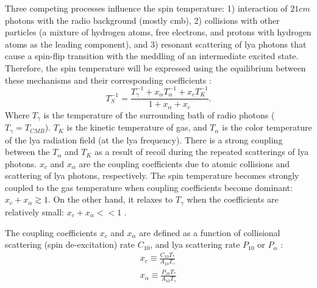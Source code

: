 \documentclass[12pt, TexShade, letterpaper]{report}
\begin{document}
Three competing processes influence the spin temperature: 1) interaction of $21cm$ photons with the radio background (mostly \gls{cmb}), 2) collisions with other particles (a mixture of hydrogen atoms, free electrons, and protons with hydrogen atoms as the leading component), and 3) resonant scattering of \gls{lya} photons that cause a spin-flip transition with the meddling of an intermediate excited state. Therefore, the spin temperature will be expressed using the equilibrium between these mechanisms and their corresponding coefficients \cite{low_frequency,21century}:
\begin{equation}
    T^{-1}_S = \frac{T^{-1}_\gamma + x_\alpha T^{-1}_\alpha + x_c T^{-1}_K}{1 + x_\alpha + x_c}.
\end{equation}
Where $T_\gamma$ is the temperature of the surrounding bath of radio photons ($T_\gamma = T_{CMB}$). $T_K$ is the kinetic temperature of gas, and $T_\alpha$ is the color temperature of the \gls{lya} radiation field (at the \gls{lya} frequency). There is a strong coupling between the $T_\alpha$ and $T_K$ as a result of recoil during the repeated scatterings of \gls{lya} photons. $x_c$ and $x_\alpha$ are the coupling coefficients due to atomic collisions and scattering of \gls{lya} photons, respectively. The spin temperature becomes strongly coupled to the gas temperature when coupling coefficients become dominant: $x_c + x_\alpha \gtrsim 1$. On the other hand, it relaxes to $T_\gamma$ when the coefficients are relatively small: $x_c + x_\alpha << 1$ \cite{21century, low_frequency}. \par
The coupling coefficients $x_c$ and $x_\alpha$ are defined as a function of collisional scattering (spin de-excitation) rate $C_{10}$, and \gls{lya} scattering rate $P_{10}$ or $P_\alpha$ \cite{explore_cosmic_dawn, low_frequency}:
\begin{gather}
    x_c \equiv \frac{C_{10}T_*}{A_{10}T_\gamma}\\
    x_\alpha \equiv \frac{P_{10} T_*}{A_{10}T_\gamma} \label{eq:x_a}
\end{gather}
\end{document}
